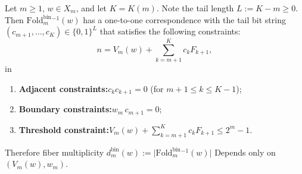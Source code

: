 \begin{proposition}\label{prop:fold-bin-fiber-tail}
Let \(m\ge 1\), \(w\in X_m\), and let \(K=K(m)\). Note the tail length \(L:=K-m\ge 0\).
Then \(\mathrm{Fold}^{\mathrm{bin}}_m{}^{-1}(w)\) has a one-to-one correspondence with the tail bit string \((c_{m+1},\dots,c_K)\in\{0,1\}^{L}\) that satisfies the following constraints:
\[
n
=V_m(w)+\sum_{k=m+1}^{K} c_k F_{k+1},
\]
in
\begin{enumerate}
\item \textbf{Adjacent constraints:}\quad \(c_k c_{k+1}=0\) (for \(m+1\le k\le K-1\));
\item \textbf{Boundary constraints:}\quad \(w_m\,c_{m+1}=0\);
\item \textbf{Threshold constraint:}\quad \(V_m(w)+\sum_{k=m+1}^{K} c_k F_{k+1}\le 2^m-1\).
\end{enumerate}
Therefore fiber multiplicity
\(
d^{\mathrm{bin}}_m(w):=\bigl|\mathrm{Fold}^{\mathrm{bin}}_m{}^{-1}(w)\bigr|
\)
Depends only on \((V_m(w),w_m)\).
\end{proposition}

